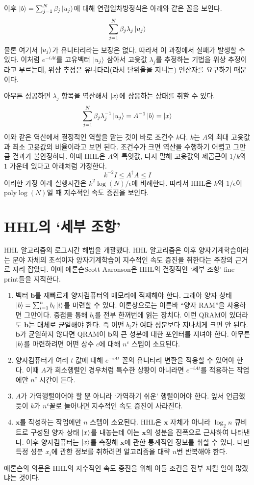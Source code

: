 \documentclass[a4paper,atbegshi,chapter,itemph,hidelinks,14pt]{oblivoir}
\begin{document}
이후 $\ket{b}=\sum_{j=1}^N\beta_j\ket{u_j}$에 대해 연립일차방정식은 아래와
같은 꼴을 보인다.
\[
  \sum_{j=1}^N\beta_j\lambda_j\ket{u_j}
\]
물론 여기서 $\ket{u_j}$가 유니타리라는 보장은 없다. 따라서 이 과정에서 실패가
발생할 수 있다. 이처럼 $e^{-iAt}$를 고유벡터 $\ket{u_j}$ 삼아서 고윳값
$\lambda_j$를 추정하는 기법을 위상 추정이라고 부르는데, 위상 추정은 유니타리(라서
단위율을 지니는) 연산자를 요구하기 때문이다. 

아무튼 성공하면 $\lambda_j$ 항목을 역산해서 $\ket{x}$에 상응하는
상태를 취할 수 있다.
\[
  \sum_{j=1}^N\beta_j\lambda_j^{-1}\ket{u_j}=A^{-1}\ket{b}=\ket{x}
\]
이와 같은 역산에서 결정적인 역할을 맡는 것이 바로 조건수 $k$다. $k$는 $A$의 최대
고윳값과 최소 고윳값의 비율이라고 보면 된다. 조건수가 크면 역산을 수행하기
어렵고 그만큼 결과가 불안정하다. 이때 HHL은 $A$의 특잇값, 다시 말해 고윳값의
제곱근이 $1/k$와 $1$ 가운데 있다고 아래처럼 가정한다.
\[
  k^{-2}I\leq A^{\dagger}A \leq I
\]
이러한 가정 아래 실행시간은 $k^2\log(N)/\epsilon$에 비례한다. 따라서 HHL은
$k$와 $1/\epsilon$이 $\textrm{poly}\log(N)$일 때 지수적인 속도 증진을 보인다.
\section{HHL의 `세부 조항'}
HHL 알고리즘의 로그시간 해법을 개괄했다. HHL 알고리즘은 이후 양자기계학습이라는
분야 자체의 초석이자 양자기계학습이 지수적인 속도 증진을 취한다는 주장의 근거로
자리 잡았다. 이에 애론슨{\tiny Scott Aaronson}은 HHL의 결정적인 `세부 조항'{\tiny
fine print}들을 지적한다.
\hfill\break
\begin{enumerate}[label=(\alph*)]
  \item 벡터 $\pmb{b}$를 재빠르게 양자컴퓨터의 매모리에 적재해야 한다. 그래야
    양자 상태 $\ket{b}=\sum_{i=1}^n b_i\ket{i}$를 마련할 수 있다. 이론상으로는
    이른바  ``양자 RAM''을 사용하면 그만이다. 중첩을 통해 $b_i$를 전부 한꺼번에
    읽는 장치다. 이런 QRAM이 있더라도 $\pmb{b}$는 대체로 균일해야 한다. 즉
    어떤 $b_i$가 여타 성분보다 지나치게 크면 안 된다. $\pmb{b}$가 균일하지
    않다면 QRAM이 $\pmb{b}$의 큰 성분에 대한 포인터를 지녀야 한다. 아무튼
    $\ket{b}$를 마련하려면 어떤 상수 $c$에 대해 $n^c$ 스텝이 소요된다.
  \item 양자컴퓨터가 여러 $t$ 값에 대해 $e^{-iAt}$ 꼴의 유니타리 변환을 적용할
    수 있어야 한다. 이때 $A$가 희소행렬인 경우처럼 특수한 상황이 아니라면
    $e^{-iAt}$를 적용하는 작업에만 $n^c$ 시간이 든다.
  \item $A$가 가역행렬이어야 할 뿐 아니라 `가역하기 쉬운' 행렬이어야 한다.
    앞서 언급했듯이 $k$가 $n^c$꼴로 늘어나면 지수적인 속도 증진이 사라진다.
  \item $\pmb{x}$를 작성하는 작업에만 $n$ 스텝이 소요된다.
    HHL은 $\pmb{x}$ 자체가 아니라 $\log_2n$ 큐비트로 구성된 양자 상태 $\ket{x}$를
    내놓는데 이는 $\pmb{x}$의 성분을 진폭으로 근사하여 나타낸다. 이후
    양자컴퓨터는 $\ket{x}$를 측정해 $\pmb{x}$에 관한 통계적인 정보를 취할 수 있다.
    다만 특정 성분 $x_i$에 관한 정보를 취하려면 알고리즘을 대략 $n$번 반복해야
    한다.
\end{enumerate}
\hfill\break
애론슨의 의문은 HHL의 지수적인 속도 증진을 위해 이들 조건을 전부 지킬 일이
많겠냐는 것이다. 
\end{document}

